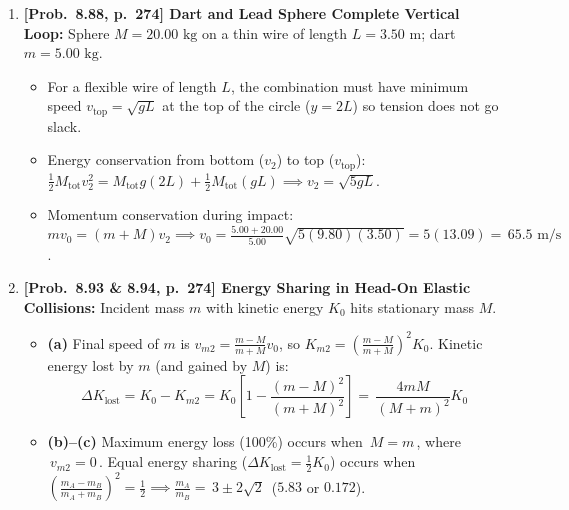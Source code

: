 \documentclass[11pt,a4paper,openany,oneside]{book}
\newcommand{\eqbox}[1]{\boxed{\,#1\,}}
\numberwithin{equation}{chapter}
\begin{document}
\begin{enumerate}[label=\textbf{Prob.\ \arabic*},leftmargin=4.2em]
  \item \textbf{[Prob.\ 8.88, p.\ 274] Dart and Lead Sphere Complete Vertical Loop:}
  Sphere $M = 20.00\text{ kg}$ on a thin wire of length $L = 3.50\text{ m}$; dart $m = 5.00\text{ kg}$.
  \begin{itemize}
    \item For a flexible wire of length $L$, the combination must have minimum speed $v_{\text{top}} = \sqrt{gL}$ at the top of the circle ($y = 2L$) so tension does not go slack.
    \item Energy conservation from bottom ($v_2$) to top ($v_{\text{top}}$): $\frac{1}{2}M_{\text{tot}}v_2^2 = M_{\text{tot}}g(2L) + \frac{1}{2}M_{\text{tot}}(gL) \implies v_2 = \sqrt{5gL}$.
    \item Momentum conservation during impact: $mv_0 = (m+M)v_2 \implies v_0 = \frac{5.00+20.00}{5.00}\sqrt{5(9.80)(3.50)} = 5(13.09) = \eqbox{65.5\text{ m/s}}$.
  \end{itemize}

  \item \textbf{[Prob.\ 8.93 \& 8.94, p.\ 274] Energy Sharing in Head-On Elastic Collisions:}
  Incident mass $m$ with kinetic energy $K_0$ hits stationary mass $M$.
  \begin{itemize}
    \item \textbf{(a)} Final speed of $m$ is $v_{m2} = \frac{m-M}{m+M}v_0$, so $K_{m2} = \left(\frac{m-M}{m+M}\right)^2 K_0$. Kinetic energy lost by $m$ (and gained by $M$) is:
    \begin{equation*}
      \Delta K_{\text{lost}} = K_0 - K_{m2} = K_0\!\left[1 - \frac{(m-M)^2}{(m+M)^2}\right] = \eqbox{\frac{4mM}{(M+m)^2}K_0}
    \end{equation*}
    \item \textbf{(b)--(c)} Maximum energy loss (100\%) occurs when $\eqbox{M = m}$, where $\eqbox{v_{m2} = 0}$. Equal energy sharing ($\Delta K_{\text{lost}} = \frac{1}{2}K_0$) occurs when $\left(\frac{m_A-m_B}{m_A+m_B}\right)^2 = \frac{1}{2} \implies \frac{m_A}{m_B} = \eqbox{3 \pm 2\sqrt{2}}$ ($5.83$ or $0.172$).
  \end{itemize}


\end{enumerate}
\end{document}
